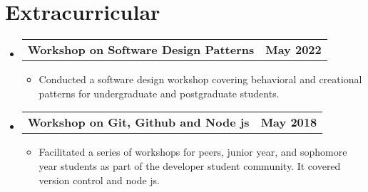\documentclass[letterpaper,11pt]{article}
\makeatletter
\newcommand{\resumeItem}[1]{
  \item\small{
    {#1 \vspace{-2pt}}
  }
}
\newcommand{\resumeProjectHeading}[2]{
    \item
    \begin{tabular*}{1.001\textwidth}{l@{\extracolsep{\fill}}r}
      \small#1 & \textbf{\small #2}\\
    \end{tabular*}\vspace{-7pt}
}
\newcommand{\resumeSubHeadingListStart}{\begin{itemize}[leftmargin=0.0in, label={}]}
\newcommand{\resumeSubHeadingListEnd}{\end{itemize}}
\newcommand{\resumeItemListStart}{\begin{itemize}}
\newcommand{\resumeItemListEnd}{\end{itemize}\vspace{-5pt}}
\makeatother
\begin{document}
\section{Extracurricular}
\vspace{-5pt}
    \resumeSubHeadingListStart
        \resumeProjectHeading
          {\textbf{Workshop on Software Design Patterns}}{May 2022}
          \resumeItemListStart
            \resumeItem{Conducted a software design workshop covering behavioral and creational patterns for undergraduate and postgraduate students. }
          \resumeItemListEnd
        \vspace{-13pt}
        \resumeProjectHeading
          {\textbf{Workshop on Git, Github and Node js}}{May 2018}
          \resumeItemListStart
            \resumeItem{Facilitated a series of workshops for peers, junior year, and sophomore year students as part of the developer student community. It covered version control and node js. }
          \resumeItemListEnd
    \resumeSubHeadingListEnd
\end{document}
